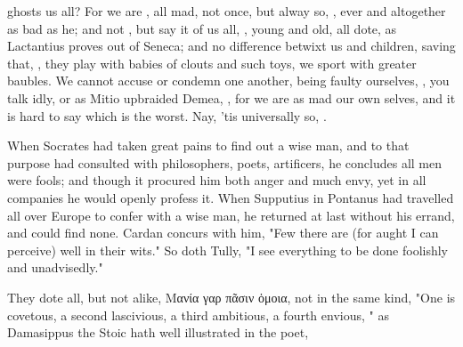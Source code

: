 ghosts us all? For we are , all mad,  not once, but alway so, , ever and
altogether as bad as he; and not , but say it
of us all, , young and old, all dote, as Lactantius proves out
of Seneca; and no difference betwixt us and children, saving that, , they play with babies of clouts and such toys,
we sport with greater baubles. We cannot accuse or condemn one another, being
faulty ourselves, , you talk idly, or as
Mitio upbraided Demea, , for we are as
mad our own selves, and it is hard to say which is the worst. Nay, 'tis
universally so, .

When Socrates had taken great pains to find out a wise man,
and to that purpose had consulted with philosophers, poets, artificers, he
concludes all men were fools; and though it procured him both anger and much
envy, yet in all companies he would openly profess it. When
Supputius in Pontanus had travelled all over Europe to
confer with a wise man, he returned at last without his errand, and could find
none. Cardan concurs with him, "Few there are (for aught I
can perceive) well in their wits." So doth Tully, "I see
everything to be done foolishly and unadvisedly."


They dote all, but not alike, \textgreek{Μανία γαρ πᾶσιν
ὁμοια}, not in the same kind, "One is covetous, a second lascivious, a third
ambitious, a fourth envious, \etc{}" as Damasippus the Stoic hath well
illustrated in the poet,

